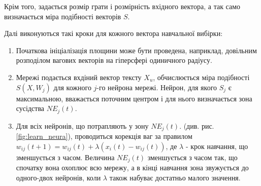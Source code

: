Крім того, задається розмір грати і розмірність вхідного вектора, а так само визначається міра подібності векторів $S$.

Далі виконуються такі кроки для кожного вектора навчальної вибірки:
\begin{enumerate}
	\item Початкова ініціалізація площини може бути проведена, наприклад, довільним розподілом вагових векторів на гіперсфері одиничного радіусу. 
	\item Мережі подається вхдіний вектор тексту $X_{u}$, обчислюється міра подібності $S(X, W_{j})$ для кожного $j$-го нейрона мережі. Нейрон, для якого $S_{j}$ є максимальною, вважається поточним центром і для нього визначається зона сусідства $NE_{j}(t)$.
	\item Для всіх нейронів, що потрапляють у зону $NE_{j}(t)$. (див. рис. \ref{fig:learn_neura}), проводиться корекція ваг за правилом $w_{ij}(t+1) = w_{ij}(t) + \lambda(x_{i}(t) - w_{ij}(t))$, де $\lambda$ - крок навчання, що зменшується з часом. Величина $NE_{j}(t)$ зменшується з часом так, що спочатку вона охоплює всю мережу, а в кінці навчання зона звужується до одного-двох нейронів, коли $\lambda$ також набуває достатньо малого значення.
\end{enumerate}

